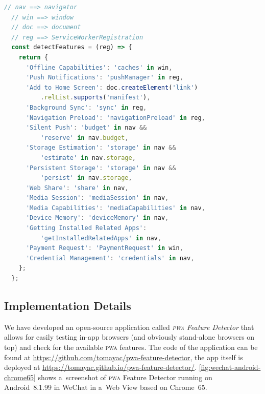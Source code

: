 \documentclass[sigconf]{acmart}
\begin{document}
\begin{lstlisting}[caption={Feature detection of various \textsc{pwa} features.},
  label=code:feature-detection, language=JavaScript, float=htb] 
  // nav ==> navigator
  // win ==> window
  // doc ==> document
  // reg ==> ServiceWorkerRegistration
  const detectFeatures = (reg) => {
    return {
      'Offline Capabilities': 'caches' in win,
      'Push Notifications': 'pushManager' in reg,
      'Add to Home Screen': doc.createElement('link')
          .relList.supports('manifest'),
      'Background Sync': 'sync' in reg,
      'Navigation Preload': 'navigationPreload' in reg,
      'Silent Push': 'budget' in nav &&
          'reserve' in nav.budget,
      'Storage Estimation': 'storage' in nav &&
          'estimate' in nav.storage,
      'Persistent Storage': 'storage' in nav &&
          'persist' in nav.storage,
      'Web Share': 'share' in nav,
      'Media Session': 'mediaSession' in nav,
      'Media Capabilities': 'mediaCapabilities' in nav,
      'Device Memory': 'deviceMemory' in nav,
      'Getting Installed Related Apps':
          'getInstalledRelatedApps' in nav,
      'Payment Request': 'PaymentRequest' in win,
      'Credential Management': 'credentials' in nav,
    };
  };    
\end{lstlisting}  

\subsection{Implementation Details}

We have developed an open-source application called \emph{\textsc{pwa} Feature Detector}
that allows for easily testing in-app browsers (and obviously stand-alone browsers on top)
and check for the available \textsc{pwa} features.
The code of the application can be found at
\url{https://github.com/tomayac/pwa-feature-detector},
the app itself is deployed at \url{https://tomayac.github.io/pwa-feature-detector/}.
\autoref{fig:wechat-android-chrome65} shows a~screenshot of \textsc{pwa} Feature Detector
running on Android~8.1.99 in WeChat in a~Web View based on Chrome~65.
\end{document}
